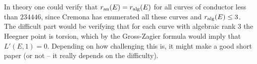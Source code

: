 \documentclass{book}
\begin{document}
In theory one could verify that $r_{\operatorname{an}}(E)=r_{\operatorname{alg}}(E)$
for all curves of conductor less than $234446$, since
Cremona has enumerated all these curves and $r_{\operatorname{alg}}(E)\leq 3$.
The difficult part would
be verifying that for each curve with algebraic rank $3$
the Heegner point is torsion, which by the Gross-Zagier
formula would imply that $L'(E,1)=0$.
Depending on how challenging this is, it might make a good
short paper (or not -- it really depends on the difficulty).







\end{document}
